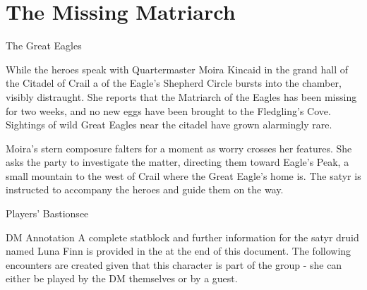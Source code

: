 \section*{The Missing Matriarch}
\begin{DndQuestHook}[width=0.5\textwidth - 4pt]{The Great Eagles}
	\DndQuestHookBasics[
		location = {Citadel of Crail},
		quest-giver = {Quartermaster of Crail and Luna Finn (Eagle's Shepherd)},
		objective = {Find out what happened to the Great Eagle's matriarch},
	]
	
	{%
		\noindent\entryfont While the heroes speak with Quartermaster Moira Kincaid in the grand hall of the Citadel of Crail a \hyperref[char:EagleShepherd]{} of the Eagle's Shepherd Circle bursts into the chamber, visibly distraught. She reports that the Matriarch of the Eagles has been missing for two weeks, and no new eggs have been brought to the Fledgling's Cove. Sightings of wild Great Eagles near the citadel have grown alarmingly rare.
		
		Moira's stern composure falters for a moment as worry crosses her features. She asks the party to investigate the matter, directing them toward Eagle's Peak, a small mountain to the west of Crail where the Great Eagle's home is. The satyr is instructed to accompany the heroes and guide them on the way.
	}%
	
	{%
		{Players' Bastion}{see \hyperref[sec:PlayersBastion]{}}%
	}%
\end{DndQuestHook}
\begingroup
	\DndSetThemeColor[PhbTan]
	\begin{DndComment}{DM Annotation}
		A complete statblock and further information for the satyr druid named Luna Finn is provided in the \hyperref[ch:CharacterStatblocks]{} at the end of this document. The following encounters are created given that this character is part of the group - she can either be played by the DM themselves or by a guest.
	\end{DndComment}
\endgroup
